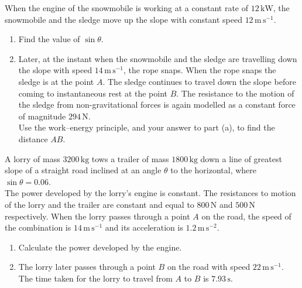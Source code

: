\documentclass[leqno]{article}
\begin{document}
\begin{enumerate}[
  label=\textbf{\arabic*.},
  leftmargin=*,
  topsep=0pt,
  partopsep=0pt,
  parsep=0pt
]
When the engine of the snowmobile is working at a constant rate of $12\,\mathrm{kW}$, the snowmobile and the sledge move up the slope with constant speed $12\,\mathrm{m\,s^{-1}}$. \\

\begin{enumerate}[label=\textbf{(\alph*)}]
  \item Find the value of $\sin\theta$.  \\
  \item Later, at the instant when the snowmobile and the sledge are travelling down the slope with speed $14\,\mathrm{m\,s^{-1}}$, the rope snaps. When the rope snaps the sledge is at the point $A$. The sledge continues to travel down the slope before coming to instantaneous rest at the point $B$. The resistance to the motion of the sledge from non-gravitational forces is again modelled as a constant force of magnitude $294\,\mathrm{N}$. \\

  Use the work--energy principle, and your answer to part (a), to find the distance $AB$.  \\
\end{enumerate}

\newpage

\questionitem

A lorry of mass $3200\,\mathrm{kg}$ tows a trailer of mass $1800\,\mathrm{kg}$ down a line of greatest slope of a straight road inclined at an angle $\theta$ to the horizontal, where $\sin\theta=0.06$. \\

The power developed by the lorry's engine is constant. The resistances to motion of the lorry and the trailer are constant and equal to $800\,\mathrm{N}$ and $500\,\mathrm{N}$ respectively. When the lorry passes through a point $A$ on the road, the speed of the combination is $14\,\mathrm{m\,s^{-1}}$ and its acceleration is $1.2\,\mathrm{m\,s^{-2}}$. \\

\begin{enumerate}[label=\textbf{(\alph*)}]
  \item Calculate the power developed by the engine.  \\
  \item The lorry later passes through a point $B$ on the road with speed $22\,\mathrm{m\,s^{-1}}$. The time taken for the lorry to travel from $A$ to $B$ is $7.93\,\mathrm{s}$. \\


\end{enumerate}
\end{enumerate}
\end{document}
